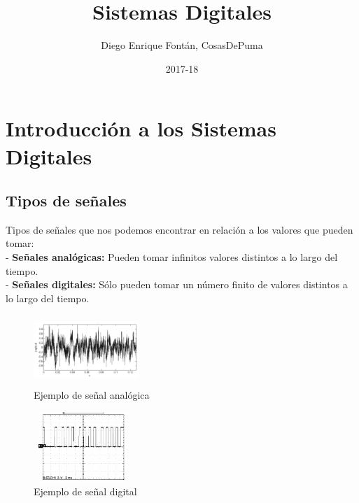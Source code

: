 \documentclass[12pt]{article}
\title{\textbf{Sistemas Digitales}}
\date{2017-18}
\author{Diego Enrique Fontán, CosasDePuma}
\begin{document}

	\maketitle
	\newpage
	
	\tableofcontents
	\newpage
	
	
	\section{Introducción a los Sistemas Digitales}
	
		\vfill
	
		\subsection{Tipos de señales}
			
			Tipos de señales que nos podemos encontrar en relación a los valores que pueden tomar:\\
		
			- \textbf{Señales analógicas:} Pueden tomar infinitos valores distintos a lo largo del tiempo.\\
		
			- \textbf{Señales digitales:} Sólo pueden tomar un número finito de valores distintos a lo largo del tiempo.\\
				
			\begin{figure}[H]
			\centering
			\includegraphics[width=150px,height=100px]{analogic}
			\caption{Ejemplo de señal analógica}
			\end{figure}
		
			\begin{figure}[H]
			\centering
			\includegraphics[width=140px,height=100px]{digital}
			\caption{Ejemplo de señal digital}
			\end{figure}
			
\end{document}
